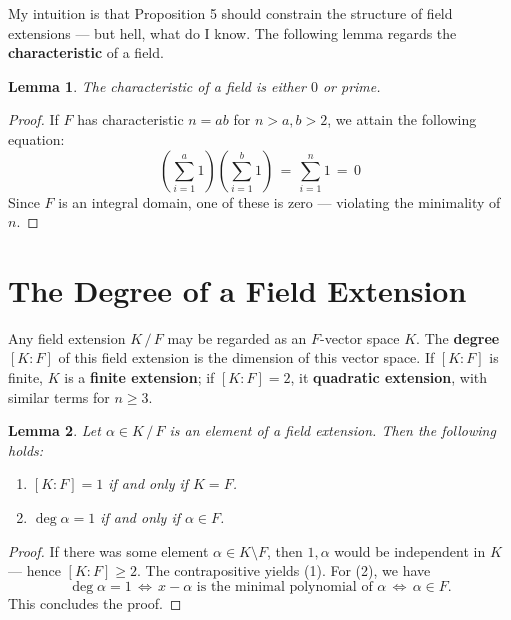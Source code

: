 \documentclass[11pt]{article}
\newtheorem{lemma}{Lemma}
\begin{document}
My intuition is that Proposition 5 should constrain the structure of field extensions --- but hell, what do I know. The following lemma regards the \textbf{characteristic} of a field.

\begin{adjustwidth}{0.5cm}{}
  \begin{lemma}
    The characteristic of a field is either $0$ or prime.
  \end{lemma}
  \begin{proof}
    If $F$ has characteristic $n = ab$ for $n > a, b > 2$, we attain the following equation:
    \[
      \left( \sum\limits_{i = 1}^{a} 1 \right) \left( \sum\limits_{i = 1}^{b} 1 \right) \, = \, \sum\limits_{i = 1}^{n} 1 \, = \, 0
    \]
    Since $F$ is an integral domain, one of these is zero --- violating the minimality of $n$.
  \end{proof}
  \newpage
\end{adjustwidth}

\section{The Degree of a Field Extension}

Any field extension $K \, / \, F$ may be regarded as an $F$-vector space $K$. The \textbf{degree} $[K : F]$ of this field extension is the dimension of this vector space. If $[K : F]$ is finite, $K$ is a \textbf{finite extension}; if $[K : F] = 2$, it \textbf{quadratic extension}, with similar terms for $n \ge 3$. 

\begin{adjustwidth}{0.5cm}{}
  \begin{lemma}
    Let $\alpha \in K \, / \, F$ is an element of a field extension. Then the following holds:
    \begin{enumerate}
      \item $[K : F] = 1$ if and only if $K = F$.
      \item $\deg \alpha = 1$ if and only if $\alpha \in F$.
    \end{enumerate}
  \end{lemma}
  \begin{proof}
    If there was some element $\alpha \in K \setminus F$, then $1, \alpha$ would be independent in $K$ --- hence $[K : F] \ge 2$. The contrapositive yields (1). For (2), we have
    \[
      \deg \alpha = 1 \, \iff \, x - \alpha \text{ is the minimal polynomial of } \alpha \, \iff \, \alpha \in F.
    \]
    This concludes the proof.
  \end{proof}
\end{adjustwidth}
\end{document}
